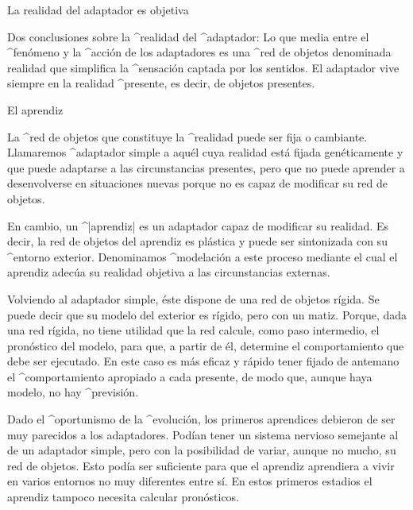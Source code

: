 \Section La realidad del adaptador es objetiva

Dos conclusiones sobre la ^{realidad} del ^{adaptador}:
\point Lo que media entre el ^{fenómeno} y la ^{acción} de los
adaptadores es una ^{red de objetos} denominada realidad que simplifica
la ^{sensación} captada por los sentidos.
\point El adaptador vive siempre en la realidad ^{presente}, es decir, de
objetos presentes.


\Section El aprendiz

La ^{red de objetos} que constituye la ^{realidad} puede ser fija o
cambiante. Llamaremos ^{adaptador simple} a aquél cuya realidad está
fijada genéticamente y que puede adaptarse a las circunstancias
presentes, pero que no puede aprender a desenvolverse en situaciones
nuevas porque no es capaz de modificar su red de objetos.

En cambio, un ^|aprendiz| es un adaptador capaz de modificar su
realidad. Es decir, la red de objetos del aprendiz es plástica y puede
ser sintonizada con su ^{entorno} exterior. Denominamos ^{modelación} a
este proceso mediante el cual el aprendiz adecúa su realidad objetiva a
las circunstancias externas.

Volviendo al adaptador simple, éste dispone de una red de objetos
rígida. Se puede decir que su modelo del exterior es rígido, pero con un
matiz. Porque, dada una red rígida, no tiene utilidad que la red
calcule, como paso intermedio, el pronóstico del modelo, para que, a
partir de él, determine el comportamiento que debe ser ejecutado. En
este caso es más eficaz y rápido tener fijado de antemano el
^{comportamiento} apropiado a cada presente, de modo que, aunque haya
modelo, no hay ^{previsión}.

Dado el ^{oportunismo} de la ^{evolución}, los primeros aprendices
debieron de ser muy parecidos a los adaptadores. Podían tener un sistema
nervioso semejante al de un adaptador simple, pero con la posibilidad de
variar, aunque no mucho, su red de objetos. Esto podía ser suficiente
para que el aprendiz aprendiera a vivir en varios entornos no muy
diferentes entre sí. En estos primeros estadios el aprendiz tampoco
necesita calcular pronósticos.

